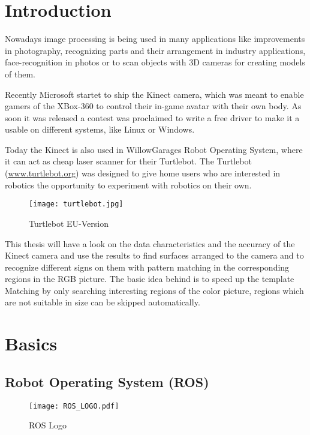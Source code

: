 \chapter{Introduction}
\graphicspath{{./Introduction/img/}}

Nowadays image processing is being used in many applications like improvements in
photography, recognizing parts and their arrangement in industry applications, 
face-recognition in photos or to scan objects with 3D cameras for creating
models of them.

Recently Microsoft startet to ship the Kinect camera, which was meant to enable
gamers of the XBox-360 to control their in-game avatar with their own body.
As soon it was released a contest was proclaimed to write a free driver to make it a
usable on different systems, like Linux or Windows.

Today the Kinect is also used in WillowGarages Robot Operating System,
where it can act as cheap laser scanner for their Turtlebot. The Turtlebot 
(\url{www.turtlebot.org}) was designed to give home users who are interested in 
robotics the opportunity to experiment with robotics on their own.

\begin{figure}[htp]
\begin{center}
  \texttt{[image: turtlebot.jpg]}
  \caption{Turtlebot EU-Version}
  \label{figure:turtlebot}
\end{center}
\end{figure}

This thesis will have a look on the data characteristics and the accuracy of the
Kinect camera and use the results to find surfaces arranged to the camera and to 
recognize different signs on them with pattern matching in the corresponding regions
in the RGB picture. The basic idea behind is to speed up the template Matching 
by only searching interesting regions of the color picture, regions which are not
suitable in size can be skipped automatically.

\chapter{Basics}

\section{Robot Operating System (ROS)}
  
\begin{figure}[htp]
	\centering
	\texttt{[image: ROS\_LOGO.pdf]}
	\caption{ROS Logo}
\end{figure} 

